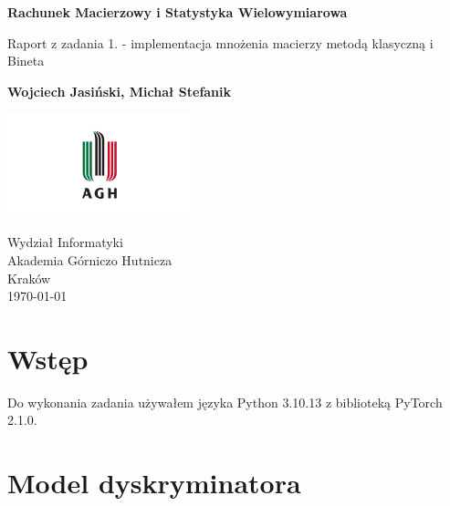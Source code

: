 \documentclass[a4paper]{article}
\begin{document}
\begin{titlepage}
    \begin{center}
        \vspace*{1cm}

        \Huge
        \textbf{Rachunek Macierzowy i Statystyka Wielowymiarowa}

        \Large
        \vspace{0.5cm}
        Raport z zadania 1. - implementacja mnożenia macierzy metodą klasyczną i Bineta

        \vspace{1.5cm}

        \textbf{Wojciech Jasiński, Michał Stefanik}

        \vfill


        \vspace{0.8cm}

        \includegraphics[width=0.4\textwidth]{agh_logo.jpg}

        Wydział Informatyki\\
        Akademia Górniczo Hutnicza\\
        Kraków\\
        \today

    \end{center}
\end{titlepage}




\section{Wstęp}
Do wykonania zadania używałem języka Python 3.10.13
z biblioteką PyTorch 2.1.0.
\section{Model dyskryminatora}
\end{document}

